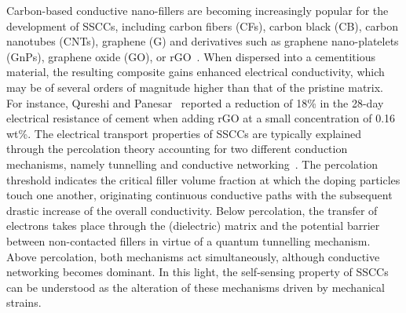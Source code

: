 \documentclass[a4paper,fleqn]{cas-sc}
\begin{document}


Carbon-based conductive nano-fillers are becoming increasingly popular for the development of SSCCs, including carbon fibers (CFs), carbon black (CB), carbon nanotubes (CNTs), graphene (G) and derivatives such as graphene nano-platelets (GnPs), graphene oxide (GO), or rGO~\cite{Tian2019}. When dispersed into a cementitious material, the resulting composite gains enhanced electrical conductivity, which may be of several orders of magnitude higher than that of the pristine matrix. For instance, Qureshi and Panesar~\cite{Qureshi2020} reported a reduction of 18\% in the 28-day electrical resistance of cement when adding rGO at a small concentration of 0.16 wt\%. The electrical transport properties of SSCCs are typically explained through the percolation theory accounting for two different conduction mechanisms, namely tunnelling and conductive networking~\cite{Chang2009}. The percolation threshold indicates the critical filler volume fraction at which the doping particles touch one another, originating continuous conductive paths with the subsequent drastic increase of the overall conductivity. Below percolation, the transfer of electrons takes place through the (dielectric) matrix and the potential barrier between non-contacted fillers in virtue of a quantum tunnelling mechanism. Above percolation, both mechanisms act simultaneously, although conductive networking becomes dominant. In this light, the self-sensing property of SSCCs can be understood as the alteration of these mechanisms driven by mechanical strains.
\end{document}
